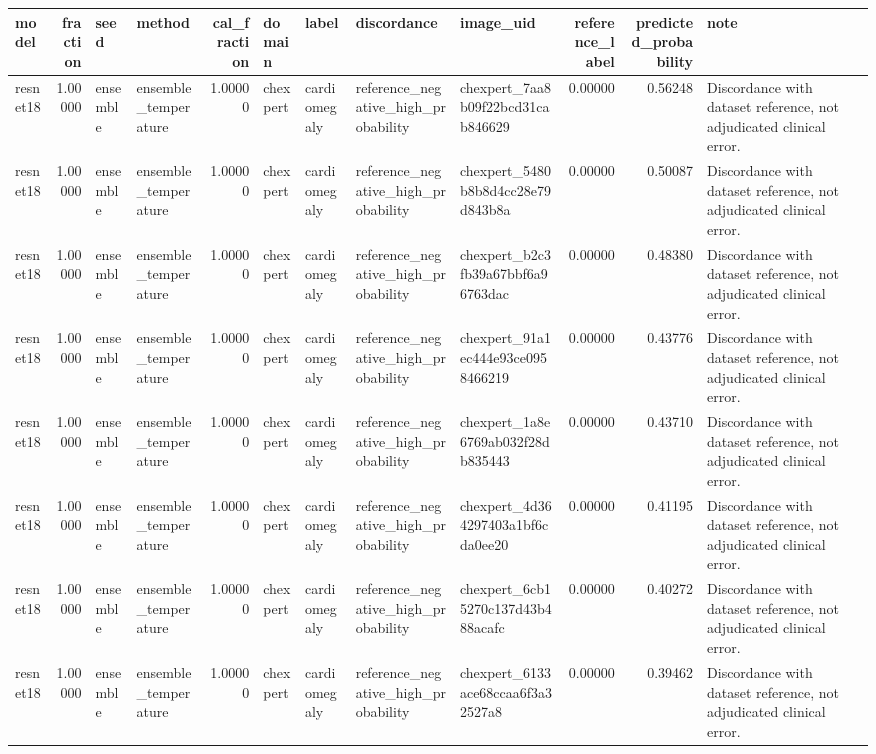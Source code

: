 \begin{tabular}{lrllrllllrrl}
\toprule
model & fraction & seed & method & cal\_fraction & domain & label & discordance & image\_uid & reference\_label & predicted\_probability & note \\
\midrule
resnet18 & 1.00000 & ensemble & ensemble\_temperature & 1.00000 & chexpert & cardiomegaly & reference\_negative\_high\_probability & chexpert\_7aa8b09f22bcd31cab846629 & 0.00000 & 0.56248 & Discordance with dataset reference, not adjudicated clinical error. \\
resnet18 & 1.00000 & ensemble & ensemble\_temperature & 1.00000 & chexpert & cardiomegaly & reference\_negative\_high\_probability & chexpert\_5480b8b8d4cc28e79d843b8a & 0.00000 & 0.50087 & Discordance with dataset reference, not adjudicated clinical error. \\
resnet18 & 1.00000 & ensemble & ensemble\_temperature & 1.00000 & chexpert & cardiomegaly & reference\_negative\_high\_probability & chexpert\_b2c3fb39a67bbf6a96763dac & 0.00000 & 0.48380 & Discordance with dataset reference, not adjudicated clinical error. \\
resnet18 & 1.00000 & ensemble & ensemble\_temperature & 1.00000 & chexpert & cardiomegaly & reference\_negative\_high\_probability & chexpert\_91a1ec444e93ce0958466219 & 0.00000 & 0.43776 & Discordance with dataset reference, not adjudicated clinical error. \\
resnet18 & 1.00000 & ensemble & ensemble\_temperature & 1.00000 & chexpert & cardiomegaly & reference\_negative\_high\_probability & chexpert\_1a8e6769ab032f28db835443 & 0.00000 & 0.43710 & Discordance with dataset reference, not adjudicated clinical error. \\
resnet18 & 1.00000 & ensemble & ensemble\_temperature & 1.00000 & chexpert & cardiomegaly & reference\_negative\_high\_probability & chexpert\_4d364297403a1bf6cda0ee20 & 0.00000 & 0.41195 & Discordance with dataset reference, not adjudicated clinical error. \\
resnet18 & 1.00000 & ensemble & ensemble\_temperature & 1.00000 & chexpert & cardiomegaly & reference\_negative\_high\_probability & chexpert\_6cb15270c137d43b488acafc & 0.00000 & 0.40272 & Discordance with dataset reference, not adjudicated clinical error. \\
resnet18 & 1.00000 & ensemble & ensemble\_temperature & 1.00000 & chexpert & cardiomegaly & reference\_negative\_high\_probability & chexpert\_6133ace68ccaa6f3a32527a8 & 0.00000 & 0.39462 & Discordance with dataset reference, not adjudicated clinical error. \\

\end{tabular}
